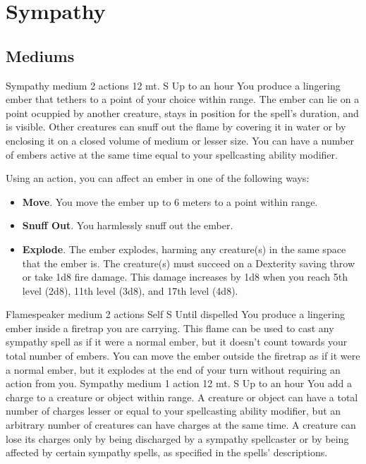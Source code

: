 \section{Sympathy}
\subsection*{Mediums}
        {Sympathy medium}
        {2 actions}
        {12 mt.}
        {S}
        {Up to an hour}
        You produce a lingering ember that tethers to a point of your choice within range.
        The ember can lie on a point ocuppied by another creature, stays in position for the spell's duration, and is visible.
        Other creatures can snuff out the flame by covering it in water or by enclosing it on a closed volume of medium or lesser size.
        You can have a number of embers active at the same time equal to your spellcasting ability modifier.

        Using an action, you can affect an ember in one of the following ways:
        \begin{itemize}
            \item \textbf{Move}.
            You move the ember up to 6 meters to a point within range.
            \item \textbf{Snuff Out}.
            You harmlessly snuff out the ember.
            \item \textbf{Explode}.
            The ember explodes, harming any creature(s) in the same space that the ember is.
            The creature(s) must succeed on a Dexterity saving throw or take 1d8 fire damage.
            This damage increases by 1d8 when you reach 5th level (2d8), 11th level (3d8), and 17th level (4d8).
        \end{itemize}
        {Flamespeaker medium}
        {2 actions}
        {Self}
        {S}
        {Until dispelled}
        You produce a lingering ember inside a firetrap you are carrying.
        This flame can be used to cast any sympathy spell as if it were a normal ember, but it doesn't count towards your total number of embers.
        You can move the ember outside the firetrap as if it were a normal ember, but it explodes at the end of your turn without requiring an action from you.
        {Sympathy medium}
        {1 action}
        {12 mt.}
        {S}
        {Up to an hour}
        You add a charge to a creature or object within range.
        A creature or object can have a total number of charges lesser or equal to your spellcasting ability modifier, but an arbitrary number of creatures can have charges at the same time.
        A creature can lose its charges only by being discharged by a sympathy spellcaster or by being affected by certain sympathy spells, as specified in the spells' descriptions.

